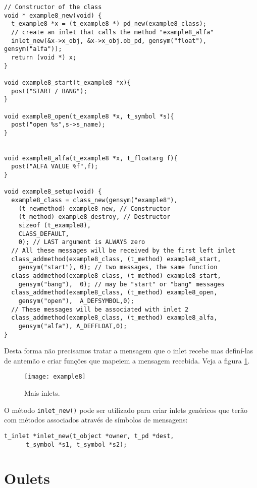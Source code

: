 \begin{lstlisting}
// Constructor of the class
void * example8_new(void) {
  t_example8 *x = (t_example8 *) pd_new(example8_class);
  // create an inlet that calls the method "example8_alfa"
  inlet_new(&x->x_obj, &x->x_obj.ob_pd, gensym("float"), gensym("alfa"));
  return (void *) x;
}

void example8_start(t_example8 *x){
  post("START / BANG");
}

void example8_open(t_example8 *x, t_symbol *s){
  post("open %s",s->s_name);
}


void example8_alfa(t_example8 *x, t_floatarg f){
  post("ALFA VALUE %f",f);
}

void example8_setup(void) {
  example8_class = class_new(gensym("example8"),
    (t_newmethod) example8_new, // Constructor
    (t_method) example8_destroy, // Destructor
    sizeof (t_example8),
    CLASS_DEFAULT,
    0); // LAST argument is ALWAYS zero
  // All these messages will be received by the first left inlet
  class_addmethod(example8_class, (t_method) example8_start, 
    gensym("start"), 0); // two messages, the same function
  class_addmethod(example8_class, (t_method) example8_start, 
    gensym("bang"),  0); // may be "start" or "bang" messages
  class_addmethod(example8_class, (t_method) example8_open,  
    gensym("open"),  A_DEFSYMBOL,0);
  // These messages will be associated with inlet 2
  class_addmethod(example8_class, (t_method) example8_alfa,  
    gensym("alfa"), A_DEFFLOAT,0); 
}
\end{lstlisting}

Desta forma não precisamos tratar a mensagem que o inlet recebe mas definí-las
de antemão e criar funções que mapeiem a mensagem recebida. Veja a figura
\ref{fig:mais-inlets}.

\begin{figure}[h!]
\centering
\texttt{[image: example8]}
\caption{Mais inlets.}
\label{fig:mais-inlets}
\end{figure}

O método \texttt{inlet\_new()} pode ser utilizado para criar inlets genéricos
que terão com métodos associados através de símbolos de mensagens:

\begin{lstlisting}
t_inlet *inlet_new(t_object *owner, t_pd *dest,
      t_symbol *s1, t_symbol *s2);
\end{lstlisting}

\section{Oulets}

